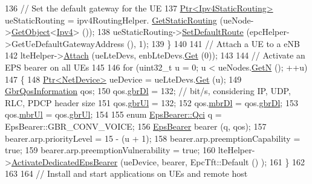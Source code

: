 \begin{DoxyCode}
136       \textcolor{comment}{// Set the default gateway for the UE}
137       \hyperlink{classns3_1_1Ptr}{Ptr<Ipv4StaticRouting>} ueStaticRouting = ipv4RoutingHelper.
      \hyperlink{classns3_1_1Ipv4StaticRoutingHelper_a731206e50d305695dac7fb2ef963a4bb}{GetStaticRouting} (ueNode->\hyperlink{classns3_1_1Object_a13e18c00017096c8381eb651d5bd0783}{GetObject}<\hyperlink{classns3_1_1Ipv4}{Ipv4}> ());
138       ueStaticRouting->\hyperlink{classns3_1_1Ipv4StaticRouting_aee30fa3246c2b42f122dabdff2725331}{SetDefaultRoute} (epcHelper->GetUeDefaultGatewayAddress (), 1);
139     \}
140 
141   \textcolor{comment}{// Attach a UE to a eNB}
142   lteHelper->\hyperlink{classns3_1_1LteHelper_a9466743f826aa2652a87907b7f0a1c87}{Attach} (ueLteDevs, enbLteDevs.\hyperlink{classns3_1_1NetDeviceContainer_a677d62594b5c9d2dea155cc5045f4d0b}{Get} (0));
143 
144   \textcolor{comment}{// Activate an EPS bearer on all UEs}
145 
146   \textcolor{keywordflow}{for} (uint32\_t u = 0; u < ueNodes.\hyperlink{classns3_1_1NodeContainer_aed647ac56d0407a7706aba02eb44b951}{GetN} (); ++u)
147     \{
148       \hyperlink{classns3_1_1Ptr}{Ptr<NetDevice>} ueDevice = ueLteDevs.\hyperlink{classns3_1_1NetDeviceContainer_a677d62594b5c9d2dea155cc5045f4d0b}{Get} (u);
149       \hyperlink{structns3_1_1GbrQosInformation}{GbrQosInformation} qos;
150       qos.\hyperlink{structns3_1_1GbrQosInformation_a70b6106f5918d464d296bc23415ec801}{gbrDl} = 132;  \textcolor{comment}{// bit/s, considering IP, UDP, RLC, PDCP header size}
151       qos.\hyperlink{structns3_1_1GbrQosInformation_a8027f26c8fd5fd643d5af7a6a879860f}{gbrUl} = 132;
152       qos.\hyperlink{structns3_1_1GbrQosInformation_ac059dd3ad95475e8df63e52d9c2235e7}{mbrDl} = qos.\hyperlink{structns3_1_1GbrQosInformation_a70b6106f5918d464d296bc23415ec801}{gbrDl};
153       qos.\hyperlink{structns3_1_1GbrQosInformation_afce406e4f92771305075ace6cfe83e36}{mbrUl} = qos.\hyperlink{structns3_1_1GbrQosInformation_a8027f26c8fd5fd643d5af7a6a879860f}{gbrUl};
154 
155       \textcolor{keyword}{enum} \hyperlink{structns3_1_1EpsBearer_aecf0c67109c5eb4ec0b07226fff5885e}{EpsBearer::Qci} q = EpsBearer::GBR\_CONV\_VOICE;
156       \hyperlink{structns3_1_1EpsBearer}{EpsBearer} bearer (q, qos);
157       bearer.arp.priorityLevel = 15 - (u + 1);
158       bearer.arp.preemptionCapability = \textcolor{keyword}{true};
159       bearer.arp.preemptionVulnerability = \textcolor{keyword}{true};
160       lteHelper->\hyperlink{classns3_1_1LteHelper_af28041edd4c96bde1a2e07c90e363dcc}{ActivateDedicatedEpsBearer} (ueDevice, bearer, EpcTft::Default ()
      );
161     \}
162 
163 
164   \textcolor{comment}{// Install and start applications on UEs and remote host}

\end{DoxyCode}
